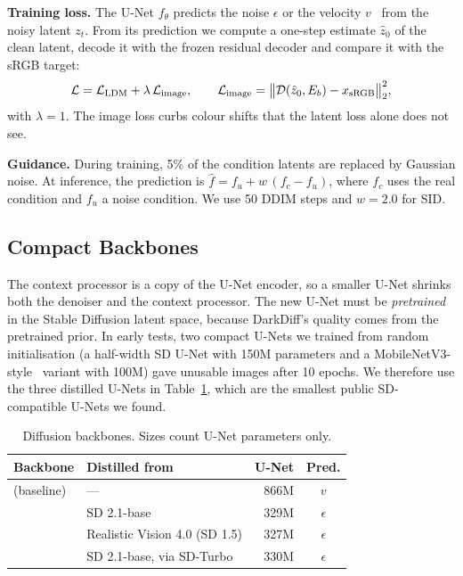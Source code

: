 \textbf{Training loss.}
The U-Net $f_\theta$ predicts the noise $\epsilon$ or the velocity $v$~\cite{salimans2022progressive}
from the noisy latent $z_t$. From its prediction we compute a one-step estimate $\hat z_0$ of the
clean latent, decode it with the frozen residual decoder and compare it with the sRGB target:
\begin{equation}
  \mathcal{L} = \mathcal{L}_{\mathrm{LDM}} + \lambda\,\mathcal{L}_{\mathrm{image}}, \qquad
  \mathcal{L}_{\mathrm{image}} = \big\| \mathcal{D}(\hat z_0, E_b) - x_{\mathrm{sRGB}} \big\|_2^2 ,
  \label{eq:loss}
\end{equation}
with $\lambda = 1$. The image loss curbs colour shifts that the latent loss alone does not see.

\textbf{Guidance.}
During training, 5\% of the condition latents are replaced by Gaussian noise. At inference, the
prediction is $\hat f = f_u + w\,(f_c - f_u)$, where $f_c$ uses the real condition and $f_u$ a
noise condition. We use 50 DDIM steps and $w = 2.0$ for SID.

\subsection{Compact Backbones}
\label{sec:backbones}

The context processor is a copy of the U-Net encoder, so a smaller U-Net shrinks both the
denoiser and the context processor. The new U-Net must be \emph{pretrained} in the Stable
Diffusion latent space, because DarkDiff's quality comes from the pretrained prior. In early
tests, two compact U-Nets we trained from random initialisation (a half-width SD U-Net with
150M parameters and a MobileNetV3-style~\cite{howard2019mobilenetv3} variant with 100M) gave
unusable images after 10 epochs. We therefore use the three distilled U-Nets in
Table~\ref{tab:backbones}, which are the smallest public SD-compatible U-Nets we found.

\begin{table}[t]
  \centering
  \caption{Diffusion backbones. Sizes count U-Net parameters only.}
  \label{tab:backbones}
  \setlength{\tabcolsep}{4pt}
  \begin{tabular}{@{}llrc@{}}
    \toprule
    Backbone & Distilled from & U-Net & Pred. \\
    \midrule
    \sdtwo{} (baseline)            & ---                                & 866M & $v$ \\
    \bksdm{}~\cite{kim2024bksdm}   & SD 2.1-base                        & 329M & $\epsilon$ \\
    \tinysd{}~\cite{segmind2023tinysd} & Realistic Vision 4.0 (SD 1.5)  & 327M & $\epsilon$ \\
    \sdxs{}~\cite{song2024sdxs}    & SD 2.1-base, via SD-Turbo          & 330M & $\epsilon$ \\
    \bottomrule
  \end{tabular}
\end{table}

